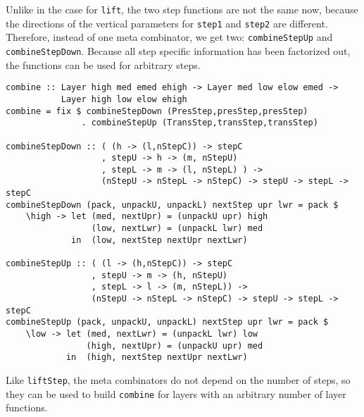 \par Unlike in the case for \texttt{lift}, the two step functions are not
        the same now, because the directions of the vertical parameters for
        \texttt{step1} and \texttt{step2} are different. Therefore, instead of one meta
        combinator, we get two: \texttt{combineStepUp} and \texttt{combineStepDown}.
        Because all step specific information has been factorized out, the functions
        can be used for arbitrary steps.\begin{small}\begin{verbatim}combine :: Layer high med emed ehigh -> Layer med low elow emed -> 
           Layer high low elow ehigh
combine = fix $ combineStepDown (PresStep,presStep,presStep) 
               . combineStepUp (TransStep,transStep,transStep) 

combineStepDown :: ( (h -> (l,nStepC)) -> stepC 
                   , stepU -> h -> (m, nStepU)
                   , stepL -> m -> (l, nStepL) ) -> 
                   (nStepU -> nStepL -> nStepC) -> stepU -> stepL -> stepC
combineStepDown (pack, unpackU, unpackL) nextStep upr lwr = pack $
    \high -> let (med, nextUpr) = (unpackU upr) high
                 (low, nextLwr) = (unpackL lwr) med
             in  (low, nextStep nextUpr nextLwr)

combineStepUp :: ( (l -> (h,nStepC)) -> stepC 
                 , stepU -> m -> (h, nStepU)
                 , stepL -> l -> (m, nStepL)) -> 
                 (nStepU -> nStepL -> nStepC) -> stepU -> stepL -> stepC
combineStepUp (pack, unpackU, unpackL) nextStep upr lwr = pack $
    \low -> let (med, nextLwr) = (unpackL lwr) low
                (high, nextUpr) = (unpackU upr) med
            in  (high, nextStep nextUpr nextLwr)\end{verbatim}\end{small}

\par Like \texttt{liftStep}, the meta combinators do not depend on the
        number of steps, so they can be used to build \texttt{combine} for layers with
        an arbitrary number of layer functions.
